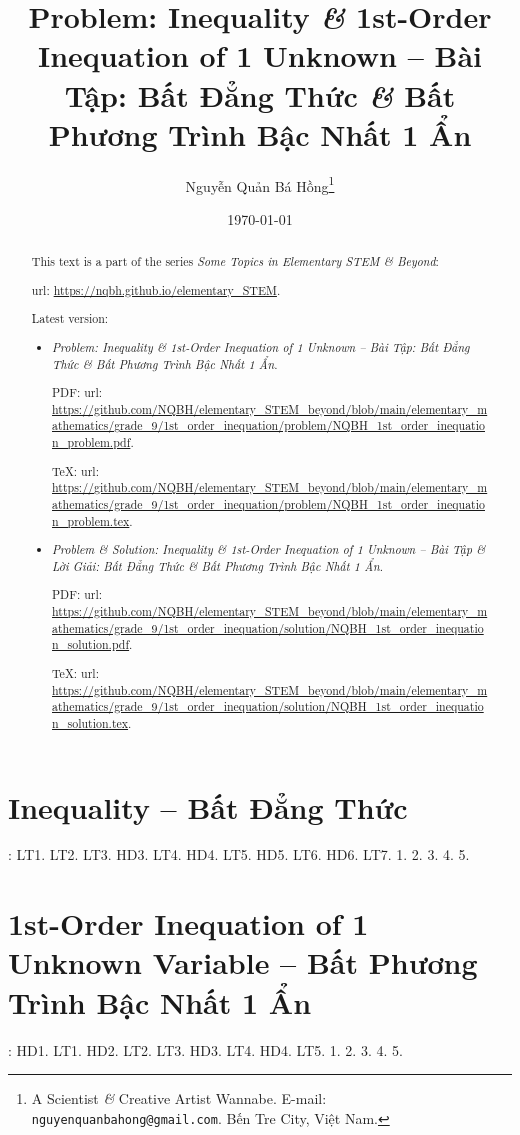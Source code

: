 \documentclass{article}
\title{Problem: Inequality {\it\&} 1st-Order Inequation of 1 Unknown -- Bài Tập: Bất Đẳng Thức {\it\&} Bất Phương Trình Bậc Nhất 1 Ẩn}
\author{Nguyễn Quản Bá Hồng\footnote{A Scientist {\it\&} Creative Artist Wannabe. E-mail: {\tt nguyenquanbahong@gmail.com}. Bến Tre City, Việt Nam.}}
\date{\today}
\begin{document}
\maketitle
\begin{abstract}
	This text is a part of the series {\it Some Topics in Elementary STEM \& Beyond}:
	
	{\sc url}: \url{https://nqbh.github.io/elementary_STEM}.
	
	Latest version:
	\begin{itemize}
		\item {\it Problem: Inequality {\it\&} 1st-Order Inequation of 1 Unknown -- Bài Tập: Bất Đẳng Thức {\it\&} Bất Phương Trình Bậc Nhất 1 Ẩn}.
		
		PDF: {\sc url}: \url{https://github.com/NQBH/elementary_STEM_beyond/blob/main/elementary_mathematics/grade_9/1st_order_inequation/problem/NQBH_1st_order_inequation_problem.pdf}.
		
		\TeX: {\sc url}: \url{https://github.com/NQBH/elementary_STEM_beyond/blob/main/elementary_mathematics/grade_9/1st_order_inequation/problem/NQBH_1st_order_inequation_problem.tex}.
		\item {\it Problem \& Solution: Inequality \& 1st-Order Inequation of 1 Unknown -- Bài Tập \& Lời Giải: Bất Đẳng Thức {\it\&} Bất Phương Trình Bậc Nhất 1 Ẩn}.
		
		PDF: {\sc url}: \url{https://github.com/NQBH/elementary_STEM_beyond/blob/main/elementary_mathematics/grade_9/1st_order_inequation/solution/NQBH_1st_order_inequation_solution.pdf}.
		
		\TeX: {\sc url}: \url{https://github.com/NQBH/elementary_STEM_beyond/blob/main/elementary_mathematics/grade_9/1st_order_inequation/solution/NQBH_1st_order_inequation_solution.tex}.
	\end{itemize}
\end{abstract}
\tableofcontents


\section{Inequality -- Bất Đẳng Thức}
\cite[\S1, pp. 28--34]{SGK_Toan_9_Canh_Dieu_tap_1}: LT1. LT2. LT3. HD3. LT4. HD4. LT5. HD5. LT6. HD6. LT7. 1. 2. 3. 4. 5.


\section{1st-Order Inequation of 1 Unknown Variable -- Bất Phương Trình Bậc Nhất 1 Ẩn}
\cite[\S2, pp. 35--41]{SGK_Toan_9_Canh_Dieu_tap_1}: HD1. LT1. HD2. LT2. LT3. HD3. LT4. HD4. LT5. 1. 2. 3. 4. 5.
\end{document}
